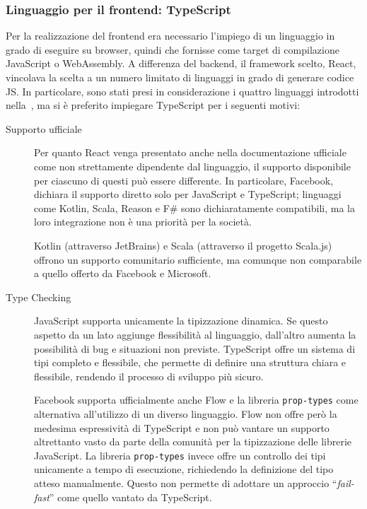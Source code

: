     \subsubsection{Linguaggio per il frontend: TypeScript}\label{subsub:ts}
      Per la realizzazione del frontend era necessario l'impiego di un linguaggio in grado di eseguire su browser, quindi che fornisse come target di compilazione JavaScript o WebAssembly.
      A differenza del backend, il framework scelto, React, vincolava la scelta a un numero limitato di linguaggi in grado di generare codice JS\@.
      In particolare, sono stati presi in considerazione i quattro linguaggi introdotti nella~, ma si è preferito impiegare TypeScript per i seguenti motivi:

      \begin{description}
        \item[Supporto ufficiale]
          Per quanto React venga presentato anche nella documentazione ufficiale~\cite{react-docs} come non strettamente dipendente dal linguaggio, il supporto disponibile per ciascuno di questi può essere differente.
          In particolare, Facebook, dichiara il supporto diretto solo per JavaScript e TypeScript;
          linguaggi come Kotlin, Scala, Reason e F\# sono dichiaratamente compatibili, ma la loro integrazione non è una priorità per la società.

          Kotlin (attraverso JetBrains) e Scala (attraverso il progetto Scala.js) offrono un supporto comunitario sufficiente, ma comunque non comparabile a quello offerto da Facebook e Microsoft.

        \item[Type Checking]
          JavaScript supporta unicamente la tipizzazione dinamica.
          Se questo aspetto da un lato aggiunge flessibilità al linguaggio, dall'altro aumenta la possibilità di bug e situazioni non previste.
          TypeScript offre un sistema di tipi completo e flessibile, che permette di definire una struttura chiara e flessibile, rendendo il processo di sviluppo più sicuro.

          Facebook supporta ufficialmente anche Flow e la libreria \texttt{prop-types} come alternativa all'utilizzo di un diverso linguaggio.
          Flow non offre però la medesima espressività di TypeScript e non può vantare un supporto altrettanto vasto da parte della comunità per la tipizzazione delle librerie JavaScript.
          La libreria \texttt{prop-types} invece offre un controllo dei tipi unicamente a tempo di esecuzione, richiedendo la definizione del tipo atteso manualmente.
          Questo non permette di adottare un approccio ``\emph{fail-fast}'' come quello vantato da TypeScript.


\end{description}

